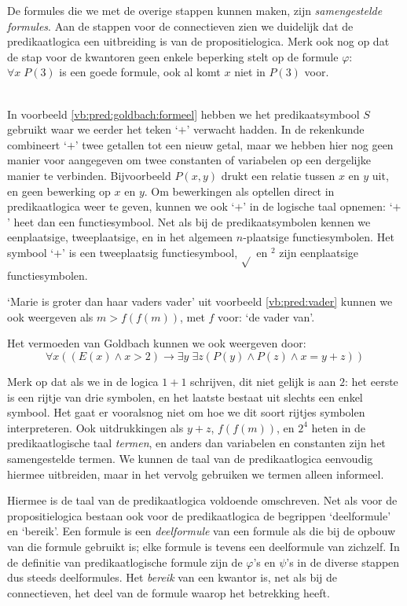 De formules die we met de overige stappen kunnen maken, zijn \textit{samengestelde formules}. Aan de stappen voor de connectieven zien we duidelijk dat de predikaatlogica een uitbreiding is van de propositielogica. Merk ook nog op dat de stap voor de kwantoren geen enkele beperking stelt op de formule $\varphi$: $\forall x\; P(3)$ is een goede formule, ook al komt $x$ niet in $P(3)$ voor.

\begin{example}\mbox{}\\
In voorbeeld \ref{vb:pred:goldbach:formeel} hebben we het predikaatsymbool $S$ gebruikt waar we eerder het teken `$+$' verwacht hadden. In de rekenkunde combineert `$+$' twee getallen tot een nieuw getal, maar we hebben hier nog geen manier voor aangegeven om twee constanten of variabelen op een dergelijke manier te verbinden. Bijvoorbeeld $P(x,y)$ drukt een relatie tussen $x$ en $y$ uit, en geen bewerking op $x$ en $y$. Om bewerkingen als optellen direct in predikaatlogica weer te geven, kunnen we ook `$+$' in de logische taal opnemen: `$+$' heet dan een functiesymbool. Net als bij de predikaatsymbolen kennen we eenplaatsige, tweeplaatsige, en in het algemeen $n$-plaatsige functiesymbolen. Het symbool `$+$' is een tweeplaatsig functiesymbool, $\sqrt{}$ en $^2$ zijn eenplaatsige functiesymbolen.

`Marie is groter dan haar vaders vader' uit voorbeeld \ref{vb:pred:vader} kunnen we ook weergeven als $m>f(f(m))$, met $f$ voor: `de vader van'.

Het vermoeden van Goldbach kunnen we ook weergeven door:
$$\forall x((E(x)\wedge x>2)\rightarrow\exists y\;\exists z(P(y)\wedge P(z)\wedge x=y+z))$$

Merk op dat als we in de logica $1+1$ schrijven, dit niet gelijk is aan $2$: het eerste is een rijtje van drie symbolen, en het laatste bestaat uit slechts een enkel symbool. Het gaat er vooralsnog niet om hoe we dit soort rijtjes symbolen interpreteren. Ook uitdrukkingen als $y+z$, $f(f(m))$, en $2^4$ heten in de predikaatlogische taal \textit{termen}, en anders dan variabelen en constanten zijn het samengestelde termen. We kunnen de taal van de predikaatlogica eenvoudig hiermee uitbreiden, maar in het vervolg gebruiken we termen alleen informeel.
\end{example}

Hiermee is de taal van de predikaatlogica voldoende omschreven. Net als voor de propositielogica bestaan ook voor de predikaatlogica de begrippen `deelformule' en `bereik'. Een formule is een \textit{deelformule} van een formule als die bij de opbouw van die formule gebruikt is; elke formule is tevens een deelformule van zichzelf. In de definitie van predikaatlogische formule zijn de $\varphi$'s en $\psi$'s in de diverse stappen dus steeds deelformules. Het \textit{bereik} van een kwantor is, net als bij de connectieven, het deel van de formule waarop het betrekking heeft.

